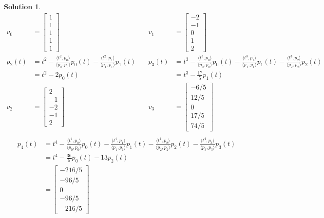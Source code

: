 \documentclass[11pt]{scrartcl}
\theoremstyle{dotlessP}
\newtheorem{sol}{Solution}[section]
\theoremstyle{dotlessN}
\newcommand{\ip}[2]{\langle #1, #2 \rangle}
\begin{document}
\begin{sol}
\begin{align*}
		v_0	&= 
		\begin{bmatrix}
			1 \\
			1 \\
			1 \\
			1 \\
			1
		\end{bmatrix} &\quad
		v_1	&= 
			\begin{bmatrix}
				-2 \\
				-1 \\
				0 \\
				1 \\
				2
			\end{bmatrix} \\
		p_2(t) &= t^2 - \frac{\ip{t^2}{p_0}}{\ip{p_0}{p_0}}p_0(t) - \frac{\ip{t^2}{p_1}}{\ip{p_1}{p_1}}p_1(t) &\quad 
		p_3(t) &= t^3 - 
		\frac{\ip{t^3}{p_0}}{\ip{p_0}{p_0}}p_0(t) - \frac{\ip{t^3}{p_1}}{\ip{p_1}{p_1}}p_1(t) - \frac{\ip{t^3}{p_2}}{\ip{p_2}{p_2}}p_2(t)
		\\
			&= 
		t^2 - 2p_0(t) &\quad &= t^3 - \frac{17}{5}p_1(t)\\
			v_2&= 
			\begin{bmatrix}
				2 \\
				-1 \\
				-2 \\
				-1 \\
				2
			\end{bmatrix} &\quad v_3 &= 
			\begin{bmatrix}
				-6/5 \\
				12/5 \\
				0 \\
				17/5 \\
				74/5
			\end{bmatrix} \\
		\end{align*}
		\begin{align*}
			p_4(t) &= t^4 - \frac{\ip{t^4}{p_0}}{\ip{p_0}{p_0}}p_0(t) - \frac{\ip{t^4}{p_1}}{\ip{p_1}{p_1}}p_1(t) - \frac{\ip{t^4}{p_2}}{\ip{p_2}{p_2}}p_2(t) - \frac{\ip{t^4}{p_3}}{\ip{p_3}{p_3}}p_3(t)	\\
				   &= t^4 - \frac{36}{5}p_0(t) - 13p_2(t) \\
				   &= 
				   \begin{bmatrix}
				   	-216/5 \\
					-96/5 \\
					0 \\
					-96/5 \\
					-216/5
				   \end{bmatrix}
		\end{align*}
\end{sol}
\end{document}
